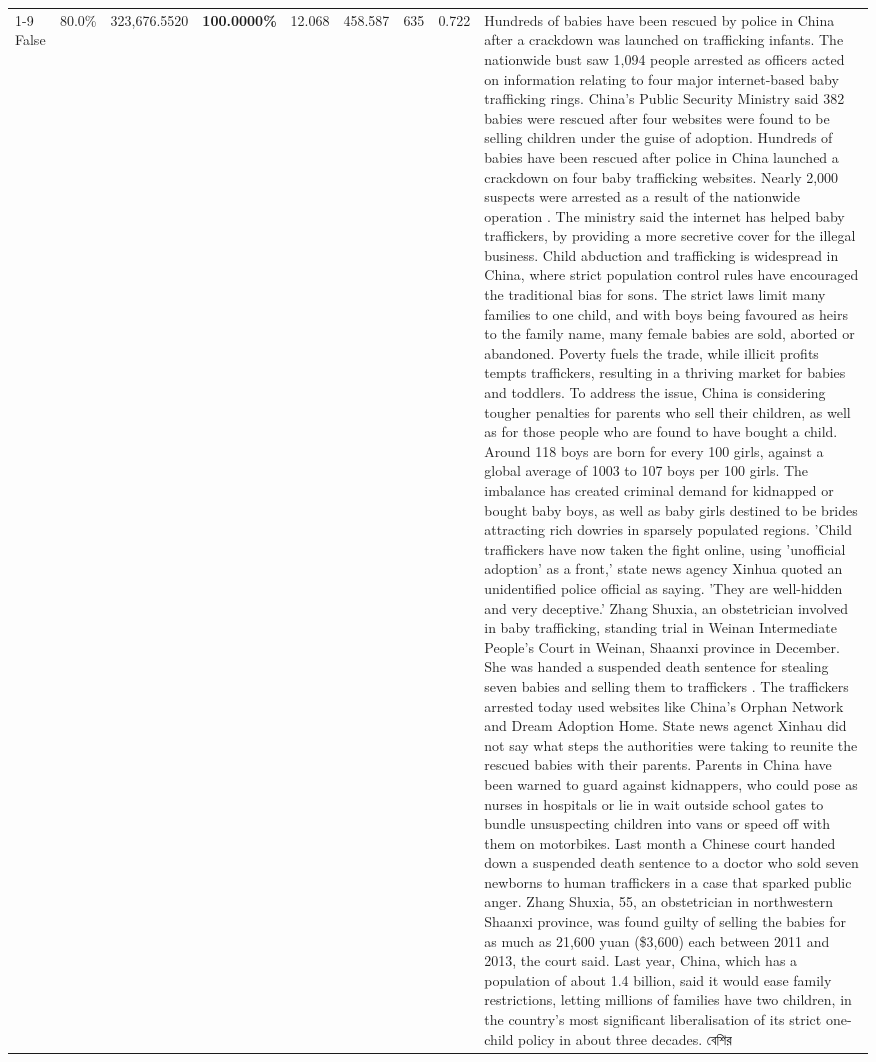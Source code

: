 \begin{table}[H]
\begin{tabular}{lllrlllll}
\cline{1-9}
False & 80.0\% & 323,676.5520 & \bfseries \color{red} 100.0000\% & 12.068 & 458.587 & 635 & 0.722 & Hundreds of babies have been rescued by police in China after a crackdown was launched on trafficking infants. The nationwide bust saw 1,094 people arrested as officers acted on information relating to four major internet-based baby trafficking rings. China's Public Security Ministry said 382 babies were rescued after four websites were found to be selling children under the guise of adoption. Hundreds of babies have been rescued after police in China launched a crackdown on four baby trafficking websites. Nearly 2,000 suspects were arrested as a result of the nationwide operation . The ministry said the internet has helped baby traffickers, by providing a more secretive cover for the illegal business. Child abduction and trafficking is widespread in China, where strict population control rules have encouraged the traditional bias for sons. The strict laws limit many families to one child, and with boys being favoured as heirs to the family name, many female babies are sold, aborted or abandoned. Poverty fuels the trade, while illicit profits tempts traffickers, resulting in a thriving market for babies and toddlers. To address the issue, China is considering tougher penalties for parents who sell their children, as well as for those people who are found to have bought a child. Around 118 boys are born for every 100 girls, against a global average of 1003 to 107 boys per 100 girls. The imbalance has created criminal demand for kidnapped or bought baby boys, as well as baby girls destined to be brides attracting rich dowries in sparsely populated regions. 'Child traffickers have now taken the fight online, using 'unofficial adoption' as a front,' state news agency Xinhua quoted an unidentified police official as saying. 'They are well-hidden and very deceptive.' Zhang Shuxia, an obstetrician involved in baby trafficking, standing trial in Weinan Intermediate People's Court in Weinan, Shaanxi province in December. She was handed a suspended death sentence for stealing seven babies and selling them to traffickers . The traffickers arrested today used websites like China's Orphan Network and Dream Adoption Home. State news agenct Xinhau did not say what steps the authorities were taking to reunite the rescued babies with their parents. Parents in China have been warned to guard against kidnappers, who could pose as nurses in hospitals or lie in wait outside school gates to bundle unsuspecting children into vans or speed off with them on motorbikes. Last month a Chinese court handed down a suspended death sentence to a doctor who sold seven newborns to human traffickers in a case that sparked public anger. Zhang Shuxia, 55, an obstetrician in northwestern Shaanxi province, was found guilty of selling the babies for as much as 21,600 yuan (\$3,600) each between 2011 and 2013, the court said. Last year, China, which has a population of about 1.4 billion, said it would ease family restrictions, letting millions of families have two children, in the country's most significant liberalisation of its strict one-child policy in about three decades. বেশির \\

\end{tabular}
\end{table}
